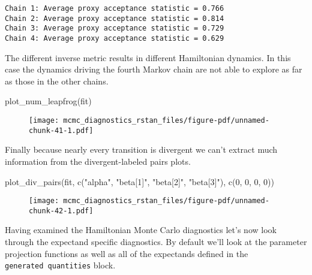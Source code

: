 \documentclass[
  letterpaper,
  DIV=11,
  numbers=noendperiod]{scrartcl}
\newenvironment{Shaded}{\begin{snugshade}}{\end{snugshade}}
\newcommand{\DecValTok}[1]{\textcolor[rgb]{0.68,0.00,0.00}{#1}}
\newcommand{\FunctionTok}[1]{\textcolor[rgb]{0.28,0.35,0.67}{#1}}
\newcommand{\NormalTok}[1]{\textcolor[rgb]{0.00,0.23,0.31}{#1}}
\newcommand{\StringTok}[1]{\textcolor[rgb]{0.13,0.47,0.30}{#1}}
\begin{document}
\begin{verbatim}
Chain 1: Average proxy acceptance statistic = 0.766
Chain 2: Average proxy acceptance statistic = 0.814
Chain 3: Average proxy acceptance statistic = 0.729
Chain 4: Average proxy acceptance statistic = 0.629
\end{verbatim}

The different inverse metric results in different Hamiltonian dynamics.
In this case the dynamics driving the fourth Markov chain are not able
to explore as far as those in the other chains.

\begin{Shaded}
\begin{Highlighting}[]
\FunctionTok{plot\_num\_leapfrog}\NormalTok{(fit)}
\end{Highlighting}
\end{Shaded}

\begin{figure}[H]

{\centering \texttt{[image: mcmc\_diagnostics\_rstan\_files/figure-pdf/unnamed-chunk-41-1.pdf]}

}

\end{figure}

Finally because nearly every transition is divergent we can't extract
much information from the divergent-labeled pairs plots.

\begin{Shaded}
\begin{Highlighting}[]
\FunctionTok{plot\_div\_pairs}\NormalTok{(fit, }\FunctionTok{c}\NormalTok{(}\StringTok{"alpha"}\NormalTok{, }\StringTok{"beta[1]"}\NormalTok{, }\StringTok{"beta[2]"}\NormalTok{, }\StringTok{"beta[3]"}\NormalTok{),}
               \FunctionTok{c}\NormalTok{(}\DecValTok{0}\NormalTok{, }\DecValTok{0}\NormalTok{, }\DecValTok{0}\NormalTok{, }\DecValTok{0}\NormalTok{))}
\end{Highlighting}
\end{Shaded}

\begin{figure}[H]

{\centering \texttt{[image: mcmc\_diagnostics\_rstan\_files/figure-pdf/unnamed-chunk-42-1.pdf]}

}

\end{figure}

Having examined the Hamiltonian Monte Carlo diagnostics let's now look
through the expectand specific diagnostics. By default we'll look at the
parameter projection functions as well as all of the expectands defined
in the \texttt{generated\ quantities} block.
\end{document}
